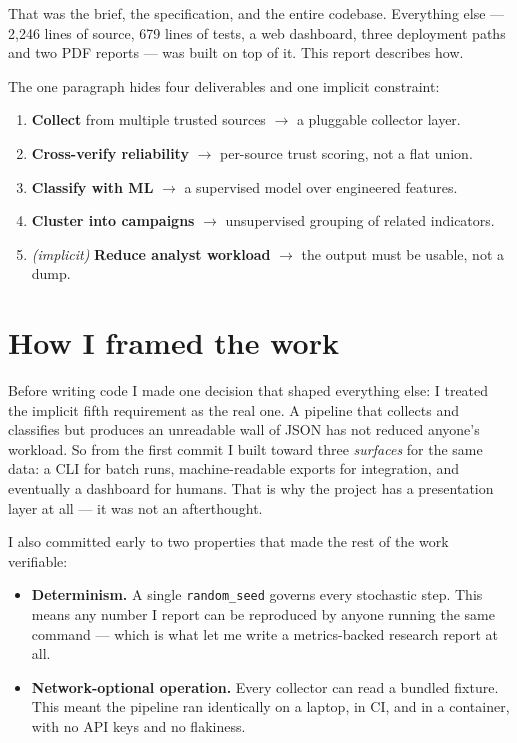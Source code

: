 \documentclass[11pt,a4paper]{article}
\newcommand{\code}[1]{\texttt{\small #1}}
\begin{document}
That was the brief, the specification, and the entire codebase. Everything else
--- 2{,}246 lines of source, 679 lines of tests, a web dashboard, three
deployment paths and two PDF reports --- was built on top of it. This report
describes how.

\begin{keybox}
The one paragraph hides four deliverables and one implicit constraint:
\begin{enumerate}[leftmargin=1.3em,itemsep=1pt,topsep=2pt]
  \item \textbf{Collect} from multiple trusted sources $\rightarrow$ a pluggable collector layer.
  \item \textbf{Cross-verify reliability} $\rightarrow$ per-source trust scoring, not a flat union.
  \item \textbf{Classify with ML} $\rightarrow$ a supervised model over engineered features.
  \item \textbf{Cluster into campaigns} $\rightarrow$ unsupervised grouping of related indicators.
  \item \emph{(implicit)} \textbf{Reduce analyst workload} $\rightarrow$ the output must be usable, not a dump.
\end{enumerate}
\end{keybox}

\section{How I framed the work}

Before writing code I made one decision that shaped everything else: I treated
the implicit fifth requirement as the real one. A pipeline that collects and
classifies but produces an unreadable wall of JSON has not reduced anyone's
workload. So from the first commit I built toward three \emph{surfaces} for the
same data: a CLI for batch runs, machine-readable exports for integration, and
eventually a dashboard for humans. That is why the project has a presentation
layer at all --- it was not an afterthought.

I also committed early to two properties that made the rest of the work
verifiable:

\begin{itemize}[leftmargin=1.4em,itemsep=3pt]
  \item \textbf{Determinism.} A single \code{random\_seed} governs every
    stochastic step. This means any number I report can be reproduced by anyone
    running the same command --- which is what let me write a metrics-backed
    research report at all.
  \item \textbf{Network-optional operation.} Every collector can read a bundled
    fixture. This meant the pipeline ran identically on a laptop, in CI, and in
    a container, with no API keys and no flakiness.
\end{itemize}
\end{document}
